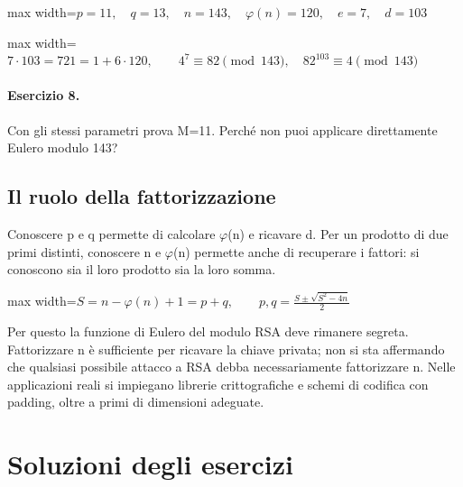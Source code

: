 \documentclass[a4paper,11pt]{article}
\begin{document}
\begin{center}\begin{adjustbox}{max width=\linewidth}$\displaystyle p=11,\quad q=13,\quad n=143,\quad\varphi(n)=120,\quad e=7,\quad d=103$\end{adjustbox}\end{center}

\begin{center}\begin{adjustbox}{max width=\linewidth}$\displaystyle 7\cdot103=721=1+6\cdot120,\qquad4^7\equiv82\pmod{143},\quad82^{103}\equiv4\pmod{143}$\end{adjustbox}\end{center}

\paragraph{Esercizio 8.} Con gli stessi parametri prova M=11. Perché non puoi applicare direttamente Eulero modulo 143?

\subsection{Il ruolo della fattorizzazione}

Conoscere p e q permette di calcolare $\varphi$(n) e ricavare d. Per un prodotto di due primi distinti, conoscere n e $\varphi$(n) permette anche di recuperare i fattori: si conoscono sia il loro prodotto sia la loro somma.

\begin{center}\begin{adjustbox}{max width=\linewidth}$\displaystyle S=n-\varphi(n)+1=p+q,\qquad p,q=\frac{S\pm\sqrt{S^2-4n}}2$\end{adjustbox}\end{center}

Per questo la funzione di Eulero del modulo RSA deve rimanere segreta. Fattorizzare n è sufficiente per ricavare la chiave privata; non si sta affermando che qualsiasi possibile attacco a RSA debba necessariamente fattorizzare n. Nelle applicazioni reali si impiegano librerie crittografiche e schemi di codifica con padding, oltre a primi di dimensioni adeguate.

\clearpage

\section{Soluzioni degli esercizi}
\end{document}
